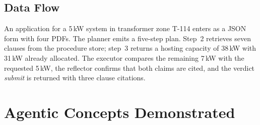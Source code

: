 \documentclass[12pt,a4paper,oneside]{report}
\newif\ifguidance
\newcommand{\guide}[1]{%
  \ifguidance
  \begin{tcolorbox}[enhanced,breakable,colback=guidebg,colframe=bmsblue,
    boxrule=0.6pt,arc=2pt,left=6pt,right=6pt,top=4pt,bottom=4pt,
    fonttitle=\bfseries\small,title={What to write here},
    before upper={\small\setstretch{1.1}}]
  #1
  \end{tcolorbox}
  \fi}
\newcommand{\dodont}[2]{%
  \ifguidance
  \begin{tcolorbox}[enhanced,breakable,sidebyside,sidebyside align=top seam,
    colback=dobg,colbacklower=dontbg,colframe=gray!60,boxrule=0.5pt,arc=2pt,
    lefthand ratio=0.5,left=5pt,right=5pt,top=4pt,bottom=4pt,
    fontupper=\small\setstretch{1.05},fontlower=\small\setstretch{1.05}]
  \textbf{\textcolor{ForestGreen}{\checkmark\ Do}}
  \begin{itemize}[leftmargin=12pt,itemsep=1pt,topsep=2pt]#1\end{itemize}
  \tcblower
  \textbf{\textcolor{BrickRed}{$\times$ Don't}}
  \begin{itemize}[leftmargin=12pt,itemsep=1pt,topsep=2pt]#2\end{itemize}
  \end{tcolorbox}
  \fi}
\newcommand{\pagebudget}[1]{%
  \ifguidance\noindent{\small\textcolor{bmsblue}{\textbf{Expected length:} #1 pages}}\par\medskip\fi}
\newenvironment{sample}
  {\par\noindent{\footnotesize\bfseries\textcolor{BrickRed}{[SAMPLE --- replace with your own content]}}\par\color{samplecol}}
  {\par\medskip}
\begin{document}
\section{Data Flow}
\guide{Trace one input end-to-end through the system, naming the data at each stage. A sequence
diagram is recommended.}
\dodont{\item Follow one concrete example input.
}
{\item Do not describe data flow only in abstract terms.
}

\begin{sample}
An application for a 5\,kW system in transformer zone T-114 enters as a JSON form with four PDFs.
The planner emits a five-step plan. Step~2 retrieves seven clauses from the procedure store;
step~3 returns a hosting capacity of 38\,kW with 31\,kW already allocated. The executor compares the
remaining 7\,kW with the requested 5\,kW, the reflector confirms that both claims are cited, and the
verdict \emph{submit} is returned with three clause citations.
\end{sample}


\chapter{Agentic Concepts Demonstrated}
\pagebudget{3--4}
\guide{Map your system explicitly to the concept checklist in Section~5 of the project guidelines.
All five Mandatory concepts must be covered. For each concept, give concrete evidence: a trace
excerpt, a screenshot, a log line or a figure number.}
\end{document}
